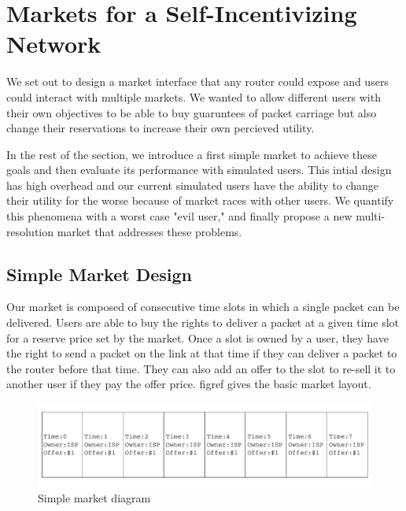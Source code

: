 \section{Markets for a Self-Incentivizing Network}
\label{sec:designs}
We set out to design a market interface that any router could expose and users could interact with multiple markets.
We wanted to allow different users with their own objectives to be able to buy guaruntees of packet carriage but also change their reservations to increase their own percieved utility.

In the rest of the section, we introduce a first simple market to achieve these goals and then evaluate its performance with simulated users.
This intial design has high overhead and our current simulated users have the ability to change their utility for the worse because of market races with other users. We quantify this phenomena with a worst case "evil user," and finally propose a new multi-resolution market that addresses these problems.

%
%
%
%

\subsection{Simple Market Design}
Our market is composed of consecutive time slots in which a single packet can be delivered. Users are able to buy the rights to deliver a packet at a given time slot for a reserve price set by the market. Once a slot is owned by a user, they have the right to send a packet on the link at that time if they can deliver a packet to the router before that time. They can also add an offer to the slot to re-sell it to another user if they pay the offer price. figref gives the basic market layout.

\begin{figure}
\includegraphics[width=\columnwidth]{diagrams/simple_market.pdf}
\caption{Simple market diagram}
\label{f:simple_market}
\end{figure}

